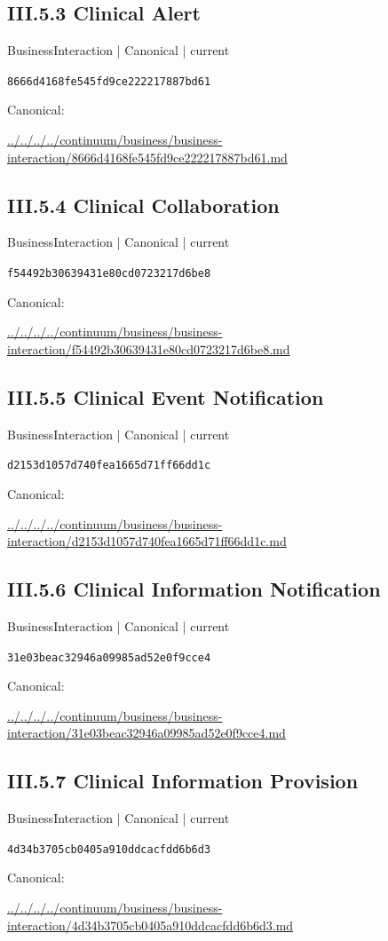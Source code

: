 \documentclass[10pt,a4paper]{article}
\begin{document}
\subsection*{III.5.3 Clinical Alert}
{\small BusinessInteraction | Canonical | current}\par
\texttt{8666d4168fe545fd9ce222217887bd61}\par
Canonical: \par
{\footnotesize\url{../../../../continuum/business/business-interaction/8666d4168fe545fd9ce222217887bd61.md}}\par
\subsection*{III.5.4 Clinical Collaboration}
{\small BusinessInteraction | Canonical | current}\par
\texttt{f54492b30639431e80cd0723217d6be8}\par
Canonical: \par
{\footnotesize\url{../../../../continuum/business/business-interaction/f54492b30639431e80cd0723217d6be8.md}}\par
\subsection*{III.5.5 Clinical Event Notification}
{\small BusinessInteraction | Canonical | current}\par
\texttt{d2153d1057d740fea1665d71ff66dd1c}\par
Canonical: \par
{\footnotesize\url{../../../../continuum/business/business-interaction/d2153d1057d740fea1665d71ff66dd1c.md}}\par
\subsection*{III.5.6 Clinical Information Notification}
{\small BusinessInteraction | Canonical | current}\par
\texttt{31e03beac32946a09985ad52e0f9cce4}\par
Canonical: \par
{\footnotesize\url{../../../../continuum/business/business-interaction/31e03beac32946a09985ad52e0f9cce4.md}}\par
\subsection*{III.5.7 Clinical Information Provision}
{\small BusinessInteraction | Canonical | current}\par
\texttt{4d34b3705cb0405a910ddcacfdd6b6d3}\par
Canonical: \par
{\footnotesize\url{../../../../continuum/business/business-interaction/4d34b3705cb0405a910ddcacfdd6b6d3.md}}\par
\end{document}
